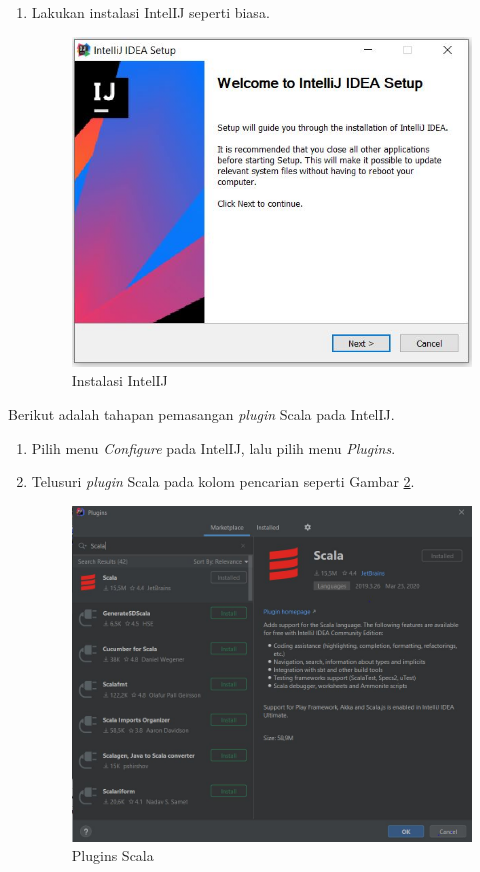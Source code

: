 \documentclass[a4paper,twoside]{article}
\begin{document}
\begin{enumerate}
\begin{enumerate}
\item Lakukan instalasi IntelIJ seperti biasa.
\begin{figure}[H]
	\centering
	\includegraphics[scale=0.7]{intelij_install}
	\caption{Instalasi IntelIJ}
	\label{fig:intelij_install}
\end{figure}

\end{enumerate}

\noindent Berikut adalah tahapan pemasangan \textit{plugin} Scala pada IntelIJ.

\begin{enumerate}

\item Pilih menu \textit{Configure} pada IntelIJ, lalu pilih menu \textit{Plugins}.

\item Telusuri \textit{plugin} Scala pada kolom pencarian seperti Gambar \ref{fig:intelij_2}.
\begin{figure}[H]
	\centering
	\includegraphics[scale=0.55]{intelij_2}
	\caption{Plugins Scala}
	\label{fig:intelij_2}
\end{figure}


\end{enumerate}
\end{enumerate}
\end{document}
